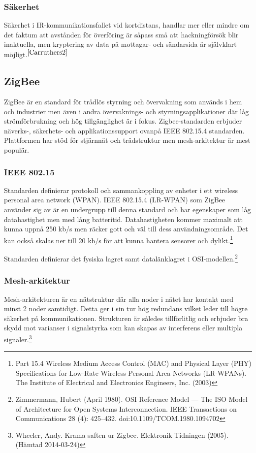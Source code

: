 \documentclass[a4paper,12pt,fleqn]{article}
\begin{document}
\subsubsection{Säkerhet}
Säkerhet i IR-kommunikationsfallet vid kortdistans, handlar mer eller mindre om det faktum att avstånden för överföring är såpass små att hackningförsök blir inaktuella, men kryptering av data på mottagar- och sändarsida är självklart möjligt.$^{\ref{Carruthers2}}$

\subsection{ZigBee}
ZigBee är en standard för trådlös styrning och övervakning som används i hem och industrier men även i andra övervaknings- och styrningsapplikationer där låg strömförbrukning och hög tillgänglighet är i fokus. Zigbee-standarden erbjuder näverks-, säkerhets- och applikationssupport ovanpå IEEE 802.15.4 standarden. Plattformen har stöd för stjärnnät och trädstruktur men mesh-arkitektur är mest populär.

\subsubsection{IEEE 802.15}
Standarden definierar protokoll och sammankoppling av enheter i ett wireless personal area network (WPAN). IEEE 802.15.4 (LR-WPAN) som ZigBee använder sig av är en undergrupp till denna standard och har egenskaper som låg datahastighet men med lång batteritid. Datahastigheten kommer maximalt att kunna uppnå 250 kb/s men räcker gott och väl till dess användningsområde. Det kan också skalas ner till 20 kb/s för att kunna hantera sensorer och dylikt.\footnote{\label{IEEE} Part 15.4 Wireless Medium Access Control (MAC) and Physical Layer (PHY) Specifications for Low-Rate Wireless Personal Area Networks (LR-WPANs). The Institute of Electrical and Electronics Engineers, Inc. (2003)}


Standarden definierar det fysiska lagret samt datalänklagret i OSI-modellen.\footnote{Zimmermann, Hubert (April 1980). OSI Reference Model — The ISO Model of Architecture for Open Systems Interconnection. IEEE Transactions on Communications 28 (4): 425–432. doi:10.1109/TCOM.1980.1094702} 


\subsubsection{Mesh-arkitektur}
Mesh-arkitekturen är en nätstruktur där alla noder i nätet har kontakt med minst 2 noder samtidigt. Detta ger i sin tur hög redundans vilket leder till högre säkerhet på kommunikationen. Strukturen är således tillförlitlig och erbjuder bra skydd mot varianser i signalstyrka som kan skapas av interferens eller multipla signaler.\footnote{\label{eltidning} Wheeler, Andy. Krama saften ur Zigbee. Elektronik Tidningen (2005).(Hämtad 2014-03-24)}
\end{document}
